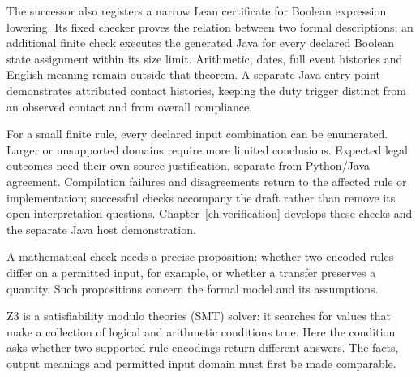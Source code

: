 \documentclass[12pt,a4paper,oneside,openany]{book}
\begin{document}
The successor also registers a narrow Lean certificate for Boolean expression
lowering. Its fixed checker proves the relation between two formal descriptions;
an additional finite check executes the generated Java for every declared
Boolean state assignment within its size limit. Arithmetic, dates, full event
histories and English meaning remain outside that theorem. A separate Java
entry point demonstrates attributed contact histories, keeping the duty trigger
distinct from an observed contact and from overall compliance.

\begin{MapDiagram}
\end{MapDiagram}

For a small finite rule, every declared input combination can be enumerated.
Larger or unsupported domains require more limited conclusions. Expected legal
outcomes need their own source justification, separate from Python/Java
agreement. Compilation failures and disagreements return to the affected rule
or implementation; successful checks accompany the draft rather than remove
its open interpretation questions. Chapter~\ref{ch:verification} develops
these checks and the separate Java host demonstration.

\clearpage
{}
A mathematical check needs a precise proposition: whether two encoded rules
differ on a permitted input, for example, or whether a transfer preserves a
quantity. Such propositions concern the formal model and its assumptions.

Z3 is a satisfiability modulo theories (SMT) solver: it searches for values that
make a collection of logical and arithmetic conditions true. Here the condition
asks whether two supported rule encodings return different answers. The facts,
output meanings and permitted input domain must first be made comparable.
\end{document}
